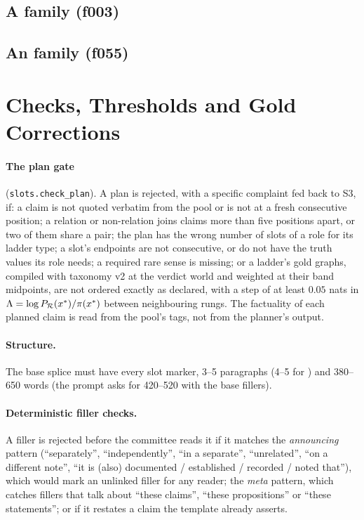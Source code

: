 \subsection{A  family (f003)}


\subsection{An  family (f055)}


\section{Checks, Thresholds and Gold Corrections}
\label{app:checks}

\paragraph{The plan gate} (\texttt{slots.check\_plan}). A plan is rejected, with a specific
complaint fed back to S3, if: a claim is not quoted verbatim from the pool or is not at a fresh
consecutive position; a relation or non-relation joins claims more than five positions apart, or
two of them share a pair; the plan has the wrong number of slots of a role for its ladder type; a
slot's endpoints are not consecutive, or do not have the truth values its role needs; a required
rare sense is missing; or a ladder's gold graphs, compiled with taxonomy v2 at the verdict world
and weighted at their band midpoints, are not ordered exactly as declared, with a step of at least
$0.05$ nats in $\Lambda=\log P_{\mathcal{R}}(x^{\ast})/\pi(x^{\ast})$ between neighbouring rungs. The factuality of each
planned claim is read from the pool's tags, not from the planner's output.

\paragraph{Structure.} The base splice must have every slot marker, 3--5 paragraphs (4--5 for
) and 380--650 words (the prompt asks for 420--520 with the base fillers).

\paragraph{Deterministic filler checks.} A filler is rejected before the committee reads it if it
matches the \emph{announcing} pattern (``separately'', ``independently'', ``in a separate'',
``unrelated'', ``on a different note'', ``it is (also) documented / established / recorded / noted
that''), which would mark an unlinked filler for any reader; the \emph{meta} pattern, which
catches fillers that talk about ``these claims'', ``these propositions'' or ``these statements'';
or if it restates a claim the template already asserts.

